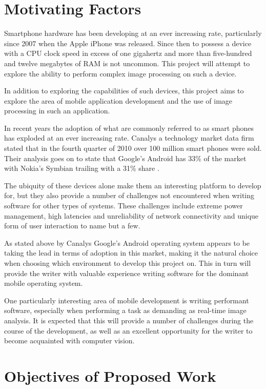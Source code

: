 \section{Motivating Factors}
Smartphone hardware has been developing at an ever increasing rate, particularly since 2007 when the Apple iPhone was released. Since then to possess a device with a CPU clock speed in excess of one gigahertz and more than five-hundred and twelve megabytes of RAM is not uncommon. This project will attempt to explore the ability to perform complex image processing on such a device.

In addition to exploring the capabilities of such devices, this project aims to explore the area of mobile application development and the use of image processing in such an application. 

In recent years the adoption of what are commonly referred to as smart phones has exploded at an ever increasing rate. Canalys a technology market data firm stated that in the fourth quarter of 2010 over 100 million smart phones were sold. Their analysis goes on to state that Google's Android has 33\% of the market with Nokia's Symbian trailing with a 31\% share \cite{canalys11}.

The ubiquity of these devices alone make them an interesting platform to develop for, but they also provide a number of challenges not encountered when writing software for other types of systems. These challenges include extreme power management, high latencies and unreliability of network connectivity and unique form of user interaction to name but a few.

As stated above by Canalys Google's Android operating system appears to be taking the lead in terms of adoption in this market, making it the natural choice when choosing which environment to develop this project on. This in turn will provide the writer with valuable experience writing software for the dominant mobile operating system.

One particularly interesting area of mobile development is writing performant software, especially when performing a task as demanding as real-time image analysis. It is expected that this will provide a number of challenges during the course of the development, as well as an excellent opportunity for the writer to become acquainted with computer vision.


\section{Objectives of Proposed Work}

